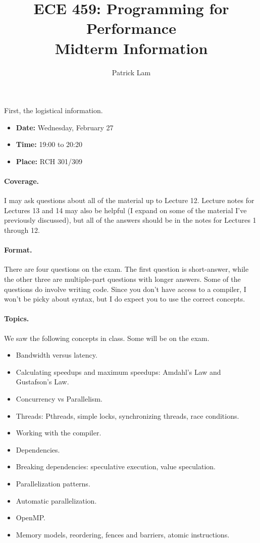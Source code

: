 \documentclass[12pt]{article}
\title{ECE 459: Programming for Performance\\Midterm Information}
\author{Patrick Lam}
\date{}
\begin{document}
\maketitle
\thispagestyle{empty}

First, the logistical information.

\begin{itemize}
\item {\bf Date:} Wednesday, February 27 
\item {\bf Time:} 19:00 to 20:20
\item {\bf Place:} RCH 301/309
\end{itemize}

\paragraph{Coverage.} I may ask questions about all of the material up to Lecture 12.
Lecture notes for Lectures 13 and 14 may also be helpful (I expand on
some of the material I've previously discussed), but all of the
answers should be in the notes for Lectures 1 through 12.

\paragraph{Format.} There are four questions on the exam. The first question is
short-answer, while the other three are multiple-part questions with
longer answers.  Some of the questions do involve writing code. Since
you don't have access to a compiler, I won't be picky about syntax,
but I do expect you to use the correct concepts.

\paragraph{Topics.} We saw the following concepts in class. Some will be on the exam.
\begin{itemize}
\item Bandwidth versus latency.
\item Calculating speedups and maximum speedups: Amdahl's Law and Gustafson's Law.
\item Concurrency vs Parallelism.
\item Threads: Pthreads, simple locks, synchronizing threads, race conditions.
\item Working with the compiler.
\item Dependencies.
\item Breaking dependencies: speculative execution, value speculation. 
\item Parallelization patterns.
\item Automatic parallelization.
\item OpenMP.
\item Memory models, reordering, fences and barriers, atomic instructions.
\end{itemize}
\end{document}
